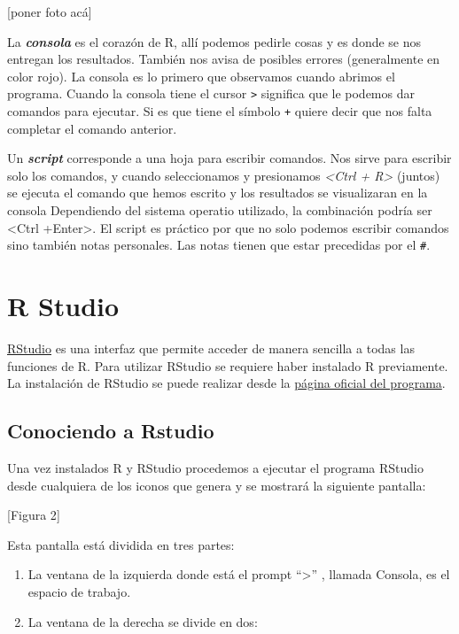 \documentclass[]{book}
\begin{document}
{[}poner foto acá{]}

La \emph{\textbf{consola}} es el corazón de R, allí podemos pedirle cosas y es donde se nos entregan los resultados. También nos avisa de posibles errores (generalmente en color rojo). La consola es lo primero que observamos cuando abrimos el programa. Cuando la consola tiene el cursor \texttt{\textgreater{}} significa que le podemos dar comandos para ejecutar. Si es que tiene el símbolo \texttt{+} quiere decir que nos falta completar el comando anterior.

Un \emph{\textbf{script}} corresponde a una hoja para escribir comandos. Nos sirve para escribir solo los comandos, y cuando seleccionamos y presionamos \emph{\textless Ctrl + R\textgreater{}} (juntos) se ejecuta el comando que hemos escrito y los resultados se visualizaran en la consola Dependiendo del sistema operatio utilizado, la combinación podría ser \textless Ctrl +Enter\textgreater. El script es práctico por que no solo podemos escribir comandos sino también notas personales. Las notas tienen que estar precedidas por el \texttt{\#}.

\hypertarget{r-studio}{%
\section{R Studio}\label{r-studio}}

\href{http://www.rstudio.org}{RStudio} es una interfaz que permite acceder de manera sencilla a todas las funciones de R. Para utilizar RStudio se requiere haber instalado R previamente. La instalación de RStudio se puede realizar desde la \href{http://www.rstudio.org}{página oficial del programa}.

\hypertarget{conociendo-a-rstudio}{%
\subsection{Conociendo a Rstudio}\label{conociendo-a-rstudio}}

Una vez instalados R y RStudio procedemos a ejecutar el programa RStudio desde cualquiera de los iconos que genera y se mostrará la siguiente pantalla:

{[}Figura 2{]}

Esta pantalla está dividida en tres partes:

\begin{enumerate}
\def\labelenumi{\arabic{enumi}.}
\item
  La ventana de la izquierda donde está el prompt ``\textgreater{}'' , llamada Consola, es el espacio de trabajo.
\item
  La ventana de la derecha se divide en dos:
\end{enumerate}
\end{document}
